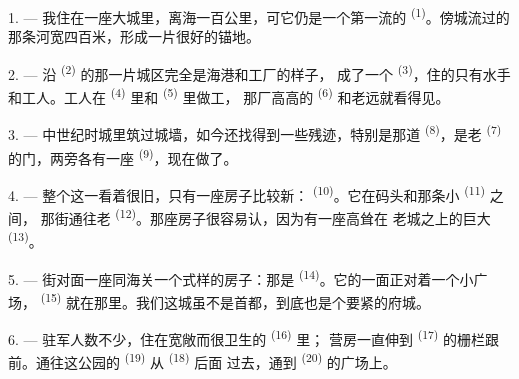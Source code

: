 
\VUsaut{2.0mm}
\VUsaut{3.0mm}
\VUfilet{16mm}
\VUsaut{5.6mm}
\VUsaut{1.4mm}
\VUsaut{2.2mm}

\VUsaut{3.0mm}

1. --- 我住在一座大城里，离海一百公里，可它仍是一个第一流的
\textsuperscript{(1)}。傍城流过的那条河宽四百米，形成一片很好的锚地。

2. --- 沿 \textsuperscript{(2)} 的那一片城区完全是海港和工厂的样子，
成了一个 \textsuperscript{(3)}，住的只有水手和工人。工人在
 \textsuperscript{(4)} 里和 \textsuperscript{(5)} 里做工，
那厂高高的 \textsuperscript{(6)} 和老远就看得见。

3. --- 中世纪时城里筑过城墙，如今还找得到一些残迹，特别是那道
\textsuperscript{(8)}，是老 \textsuperscript{(7)} 的门，两旁各有一座
 \textsuperscript{(9)}，现在做了。

4. --- 整个这一看着很旧，只有一座房子比较新：
\textsuperscript{(10)}。它在码头和那条小 \textsuperscript{(11)} 之间，
那街通往老 \textsuperscript{(12)}。那座房子很容易认，因为有一座高耸在
老城之上的巨大 \textsuperscript{(13)}。

5. --- 街对面一座同海关一个式样的房子：那是
\textsuperscript{(14)}。它的一面正对着一个小广场， \textsuperscript{(15)}
就在那里。我们这城虽不是首都，到底也是个要紧的府城。

\VUsaut{5.0mm}
\VUsaut{3.4mm}

6. --- 驻军人数不少，住在宽敞而很卫生的 \textsuperscript{(16)} 里；
营房一直伸到 \textsuperscript{(17)} 的栅栏跟前。通往这公园的
 \textsuperscript{(19)} 从 \textsuperscript{(18)} 后面
过去，通到 \textsuperscript{(20)} 的广场上。

